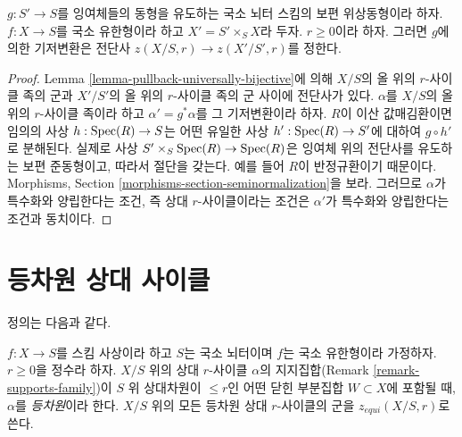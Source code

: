 \begin{lemma}
\label{lemma-seminormalize-base}
$g : S' \to S$를 잉여체들의 동형을 유도하는 국소 뇌터 스킴의
보편 위상동형이라 하자. $f : X \to S$를 국소 유한형이라 하고
$X' = S' \times_S X$라 두자. $r \geq 0$이라 하자. 그러면 $g$에
의한 기저변환은 전단사 $z(X/S, r) \to z(X'/S', r)$를 정한다.
\end{lemma}

\begin{proof}
Lemma \ref{lemma-pullback-universally-bijective}에 의해 $X/S$의 올
위의 $r$-사이클 족의 군과 $X'/S'$의 올 위의 $r$-사이클 족의 군
사이에 전단사가 있다. $\alpha$를 $X/S$의 올 위의 $r$-사이클 족이라
하고 $\alpha' = g^*\alpha$를 그 기저변환이라 하자. $R$이 이산
값매김환이면 임의의 사상 $h : \mathop{\mathrm{Spec}}(R) \to S$는 어떤 유일한 사상
$h' : \mathop{\mathrm{Spec}}(R) \to S'$에 대하여 $g \circ h'$로 분해된다. 실제로
사상 $S' \times_S \mathop{\mathrm{Spec}}(R) \to \mathop{\mathrm{Spec}}(R)$은
잉여체 위의 전단사를 유도하는 보편 준동형이고, 따라서 절단을 갖는다.
예를 들어 $R$이 반정규환이기 때문이다. Morphisms, Section
\ref{morphisms-section-seminormalization}을 보라. 그러므로 $\alpha$가
특수화와 양립한다는 조건, 즉 상대 $r$-사이클이라는 조건은
$\alpha'$가 특수화와 양립한다는 조건과 동치이다.
\end{proof}



\section{등차원 상대 사이클}
\label{section-equidimensional}

\noindent
정의는 다음과 같다.

\begin{definition}
\label{definition-equidimensional}
$f : X \to S$를 스킴 사상이라 하고 $S$는 국소 뇌터이며 $f$는
국소 유한형이라 가정하자. $r \geq 0$을 정수라 하자. $X/S$ 위의
상대 $r$-사이클 $\alpha$의 지지집합(Remark
\ref{remark-supports-family})이 $S$ 위 상대차원이 $\leq r$인
어떤 닫힌 부분집합 $W \subset X$에 포함될 때, $\alpha$를
{\it 등차원}이라 한다. $X/S$ 위의 모든 등차원 상대 $r$-사이클의
군을 $z_{equi}(X/S, r)$로 쓴다.
\end{definition}

